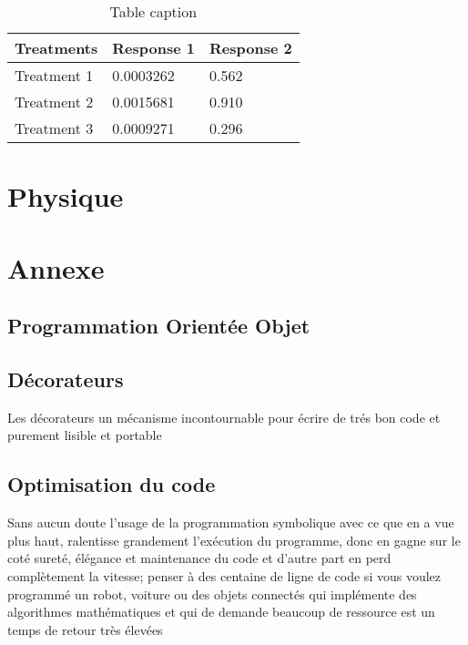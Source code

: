 \documentclass[11pt,fleqn]{book} %
\begin{document}
\begin{table}[h]
\centering
\begin{tabular}{l l l}
\toprule
\textbf{Treatments} & \textbf{Response 1} & \textbf{Response 2}\\
\midrule
Treatment 1 & 0.0003262 & 0.562 \\
Treatment 2 & 0.0015681 & 0.910 \\
Treatment 3 & 0.0009271 & 0.296 \\
\bottomrule
\end{tabular}
\caption{Table caption}
\end{table}

%


\part{Physique}



\part{Annexe}

\chapter{Programmation Orientée Objet}
\chapter{D\'ecorateurs}
Les d\'ecorateurs un m\'ecanisme incontournable pour \'ecrire de tr\'es bon code et purement 
lisible et portable
\chapter{Optimisation du code}
Sans aucun doute l'usage de la programmation symbolique avec ce que en a vue plus haut, ralentisse 
grandement l'exécution du programme, donc en gagne sur le coté sureté, élégance
et maintenance du code et d'autre part en perd complètement la vitesse; penser à des centaine de ligne 
de code si vous voulez programmé un robot, voiture ou des objets connectés qui implémente des 
algorithmes mathématiques et qui de demande beaucoup de ressource est un temps de retour très élevées 
\end{document}
